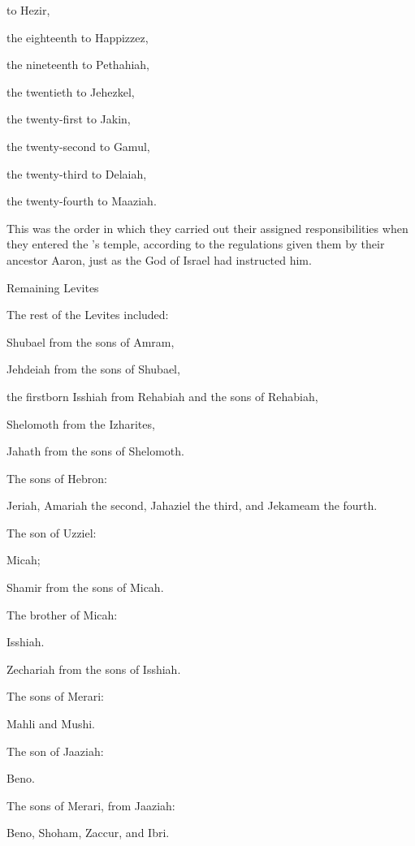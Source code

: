 {to Hezir,
\par }{\PP the eighteenth
to Happizzez,
\par }{\PP {}the nineteenth
to Pethahiah,
\par }{\PP the twentieth
to Jehezkel,
\par }{\PP {}the twenty-first
to Jakin,
\par }{\PP the twenty-second
to Gamul,
\par }{\PP {}the twenty-third
to Delaiah,
\par }{\PP the twenty-fourth
to Maaziah.
\par }{\PP {}This
was the order
in which they carried out their assigned responsibilities
when they entered
the
{}’s
temple,
according to the regulations
given them by
their ancestor
Aaron,
just
as the
{}
God
of Israel
had instructed him.
\par }{\SH Remaining Levites
\par }{\PP {}The rest
of the Levites
included:
\par }{\PP Shubael
from the sons
of Amram,
\par }{\PP Jehdeiah
from the sons
of Shubael,
\par }{\PP {}the firstborn Isshiah
from Rehabiah
and the sons
of Rehabiah,
\par }{\PP {}Shelomoth
from the Izharites,
\par }{\PP Jahath
from the sons
of Shelomoth.
\par }{\PP {}The sons
of Hebron:
\par }{\PP Jeriah,
Amariah
the second,
Jahaziel
the third,
and Jekameam
the fourth.
\par }{\PP {}The son
of Uzziel:
\par }{\PP Micah;
\par }{\PP Shamir
from the sons
of Micah.
\par }{\PP {}The brother
of Micah:
\par }{\PP Isshiah.
\par }{\PP Zechariah
from the sons
of Isshiah.
\par }{\PP {}The sons
of Merari:
\par }{\PP Mahli
and Mushi.
\par }{\PP The son
of Jaaziah:
\par }{\PP Beno.
\par }{\PP {}The sons
of Merari,
from Jaaziah:
\par }{\PP Beno, Shoham,
Zaccur,
and Ibri.
}
